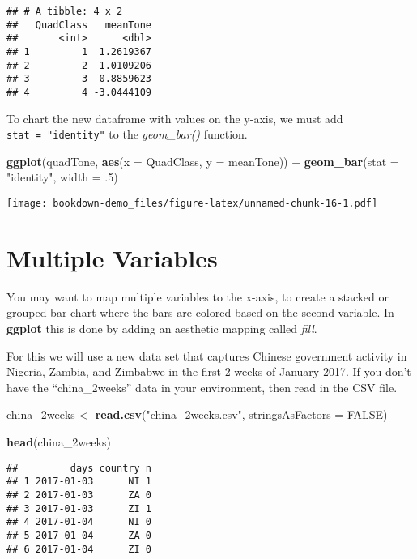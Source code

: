 \documentclass[]{book}
\newenvironment{Shaded}{\begin{snugshade}}{\end{snugshade}}
\newcommand{\KeywordTok}[1]{\textcolor[rgb]{0.13,0.29,0.53}{\textbf{{#1}}}}
\newcommand{\DataTypeTok}[1]{\textcolor[rgb]{0.13,0.29,0.53}{{#1}}}
\newcommand{\DecValTok}[1]{\textcolor[rgb]{0.00,0.00,0.81}{{#1}}}
\newcommand{\StringTok}[1]{\textcolor[rgb]{0.31,0.60,0.02}{{#1}}}
\newcommand{\OtherTok}[1]{\textcolor[rgb]{0.56,0.35,0.01}{{#1}}}
\newcommand{\NormalTok}[1]{{#1}}
\theoremstyle{definition}
\theoremstyle{definition}
\theoremstyle{remark}
\begin{document}
\begin{verbatim}
## # A tibble: 4 x 2
##   QuadClass   meanTone
##       <int>      <dbl>
## 1         1  1.2619367
## 2         2  1.0109206
## 3         3 -0.8859623
## 4         4 -3.0444109
\end{verbatim}

To chart the new dataframe with values on the y-axis, we must add
\texttt{stat\ =\ "identity"} to the \emph{geom\_bar()} function.

\begin{Shaded}
\begin{Highlighting}[]
\KeywordTok{ggplot}\NormalTok{(quadTone, }\KeywordTok{aes}\NormalTok{(}\DataTypeTok{x =} \NormalTok{QuadClass, }\DataTypeTok{y =} \NormalTok{meanTone)) +}
\StringTok{  }\KeywordTok{geom_bar}\NormalTok{(}\DataTypeTok{stat =} \StringTok{"identity"}\NormalTok{, }\DataTypeTok{width =} \NormalTok{.}\DecValTok{5}\NormalTok{)}
\end{Highlighting}
\end{Shaded}

\texttt{[image: bookdown-demo\_files/figure-latex/unnamed-chunk-16-1.pdf]}

\section{Multiple Variables}\label{multiple-variables}

You may want to map multiple variables to the x-axis, to create a
stacked or grouped bar chart where the bars are colored based on the
second variable. In \textbf{ggplot} this is done by adding an aesthetic
mapping called \emph{fill}.

For this we will use a new data set that captures Chinese government
activity in Nigeria, Zambia, and Zimbabwe in the first 2 weeks of
January 2017. If you don't have the ``china\_2weeks'' data in your
environment, then read in the CSV file.

\begin{Shaded}
\begin{Highlighting}[]
\NormalTok{china_2weeks <-}\StringTok{ }\KeywordTok{read.csv}\NormalTok{(}\StringTok{"china_2weeks.csv"}\NormalTok{, }\DataTypeTok{stringsAsFactors =} \OtherTok{FALSE}\NormalTok{)}

\KeywordTok{head}\NormalTok{(china_2weeks)}
\end{Highlighting}
\end{Shaded}

\begin{verbatim}
##         days country n
## 1 2017-01-03      NI 1
## 2 2017-01-03      ZA 0
## 3 2017-01-03      ZI 1
## 4 2017-01-04      NI 0
## 5 2017-01-04      ZA 0
## 6 2017-01-04      ZI 0
\end{verbatim}
\end{document}
